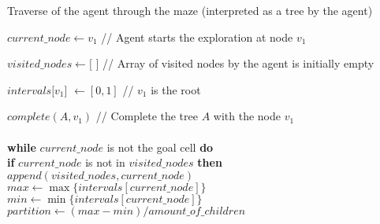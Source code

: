 \begin{algorithm}
\caption{Traverse of the agent through the maze (interpreted as a tree by the agent)}
\label{pseudocode_1}
\begin{algorithmic}

\State $current\_node \gets v_{1}$ \hspace{1cm} \slash\slash \hspace{0.1cm} Agent starts the exploration at node $v_{1}$

\State $visited\_nodes \gets [$ $]$ \hspace{0.95cm} \slash\slash \hspace{0.1cm} Array of visited nodes by the agent is initially empty

\State $intervals[v_{1}$] $\gets [0,1]$ \hspace{0.65cm} \slash\slash \hspace{0.1cm} $v_{1}$ is the root


\State $complete(A, v_{1})$ \hspace{1.55cm} \slash\slash \hspace{0.1cm} Complete the tree $A$ with the node $v_{1}$\\

\\

\textbf{while} $current\_node$ is not the goal cell \textbf{do}\\

\hspace{0.3cm} \textbf{if} $current\_node$ is not in $visited\_nodes$ \textbf{then}\\

\hspace{0.6cm} $append(visited\_nodes, current\_node)$\\

\hspace{0.6cm} $max \gets \max \{intervals[current\_node]\}$\\

\hspace{0.6cm} $min \gets \min \{intervals[current\_node]\}$\\

\hspace{0.6cm} $partition \gets (max - min) \slash amount\_of\_children$\\


\end{algorithmic}
\end{algorithm}
